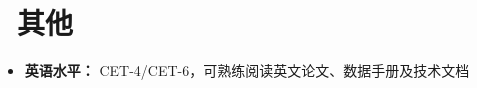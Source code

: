 \documentclass[11pt]{article}
\begin{document}
\section{\makebox[\widthof{\faInfo}][c]{\color{CVBlue}\faInfo}\ 其他}
\begin{itemize}[parsep=0.5ex]
    \item \textbf{英语水平：} CET-4/CET-6，可熟练阅读英文论文、数据手册及技术文档
\end{itemize}
\end{document}
